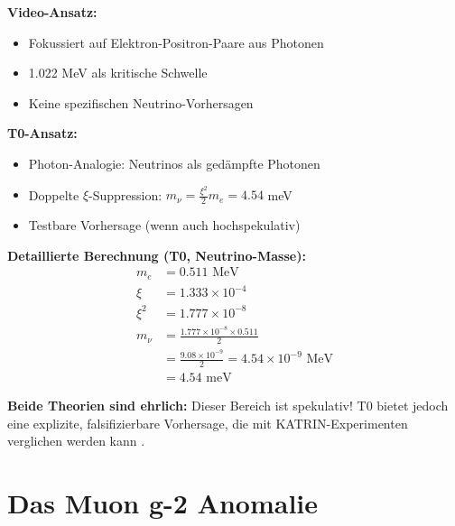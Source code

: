 \documentclass[12pt,a4paper]{article}
\newcommand{\xipar}{\xi}
\begin{document}
	\begin{vergleich}
		\textbf{Video-Ansatz:}
		\begin{itemize}
			\item Fokussiert auf Elektron-Positron-Paare aus Photonen
			\item 1.022 MeV als kritische Schwelle
			\item Keine spezifischen Neutrino-Vorhersagen
		\end{itemize}
		
		\textbf{T0-Ansatz:}
		\begin{itemize}
			\item Photon-Analogie: Neutrinos als gedämpfte Photonen
			\item Doppelte $\xipar$-Suppression: $m_\nu = \frac{\xipar^2}{2} m_e = 4.54$ meV
			\item Testbare Vorhersage (wenn auch hochspekulativ)
		\end{itemize}
		
		\textbf{Detaillierte Berechnung (T0, Neutrino-Masse):}
		\begin{align}
			m_e &= 0.511 \text{ MeV} \\
			\xipar &= 1.333 \times 10^{-4} \\
			\xipar^2 &= 1.777 \times 10^{-8} \\
			m_\nu &= \frac{1.777 \times 10^{-8} \times 0.511}{2} \\
			&= \frac{9.08 \times 10^{-9}}{2} = 4.54 \times 10^{-9} \text{ MeV} \\
			&= 4.54 \text{ meV}
		\end{align}
	\end{vergleich}
	
	\textbf{Beide Theorien sind ehrlich:} Dieser Bereich ist spekulativ! T0 bietet jedoch eine explizite, falsifizierbare Vorhersage, die mit KATRIN-Experimenten verglichen werden kann \cite{katrin_2022}.
	
	\section{Das Muon g-2 Anomalie}
	
\end{document}
